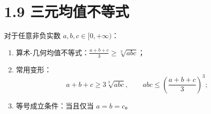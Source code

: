 \documentclass{article}
\begin{document}
\section*{1.9 三元均值不等式}
对于任意非负实数 \( a,b,c \in [0,+\infty) \)：
\begin{enumerate}
    \item 算术-几何均值不等式：\( \frac{a+b+c}{3} \geq \sqrt[3]{abc} \)；
    \item 常用变形：
    \[
    a+b+c \geq 3\sqrt[3]{abc},\qquad abc \leq \left(\frac{a+b+c}{3}\right)^3;
    \]
    \item 等号成立条件：当且仅当 \( a=b=c \)。
\end{enumerate}
\end{document}
